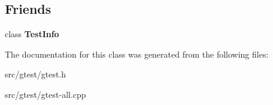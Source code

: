 \subsection*{Friends}
\begin{DoxyCompactItemize}
\item 
\mbox{\label{classtesting_1_1_test_a4c49c2cdb6c328e6b709b4542f23de3c}} 
class {\bfseries Test\+Info}
\end{DoxyCompactItemize}


The documentation for this class was generated from the following files\+:\begin{DoxyCompactItemize}
\item 
src/gtest/gtest.\+h\item 
src/gtest/gtest-\/all.\+cpp\end{DoxyCompactItemize}
